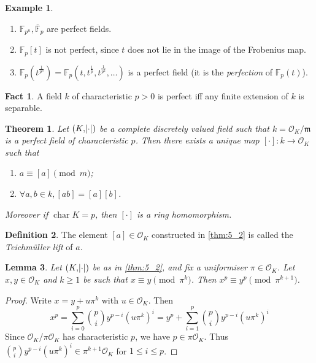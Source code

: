 \documentclass[11pt]{article}
\theoremstyle{definition}
\newtheorem{definition}{Definition}[subsection]
\newtheorem*{example}{Example}
\newtheorem*{fact}{Fact}
\theoremstyle{plain}
\newtheorem{theorem}[definition]{Theorem}
\newtheorem{lemma}[definition]{Lemma}
\theoremstyle{remark}
\DeclareMathOperator{\Char}{char}
\newcommand{\FF}{\mathbb{F}}
\newcommand{\cO}{\mathcal{O}}
\newcommand{\fm}{\mathfrak{m}}
\begin{document}
\begin{example}\phantom{}
    \begin{enumerate}
        \item $\FF_{p^n}, \overline{\FF}_p$ are perfect fields.
        \item $\FF_p[t]$ is not perfect, since $t$ does not lie in the image of the Frobenius map.
        \item $\FF_p(t^\frac{1}{p^n}) = \FF_p(t, t^\frac{1}{p}, t^\frac{1}{p^2}, \ldots)$ is a perfect field (it is the \emph{perfection} of $\FF_p(t)$).
    \end{enumerate}
\end{example}

\begin{fact}
    A field $k$ of characteristic $p > 0$ is perfect iff any finite extension of $k$ is separable.
\end{fact}

\begin{theorem}\label{thm:5_2}
    Let $(K, \abs{\cdot})$ be a complete discretely valued field such that $k = \cO_K / \fm$ is a perfect field of characteristic $p$. Then there exists a unique map $[\cdot] : k \to \cO_K$ such that
    \begin{enumerate}
        \item $a \equiv [a] \pmod{m}$;
        \item $\forall a, b \in k, [a b] = [a] [b]$.
    \end{enumerate}
    Moreover if $\Char K = p$, then $[\cdot]$ is a ring homomorphism.
\end{theorem}

\begin{definition}\label{def:5_3}
    The element $[a] \in \cO_K$ constructed in \autoref{thm:5_2} is called the \emph{Teichm\"uller lift} of $a$.
\end{definition}

\begin{lemma}\label{lem:5_4}
    Let $(K, \abs{\cdot})$ be as in \autoref{thm:5_2}, and fix a uniformiser $\pi \in \cO_K$. Let $x, y \in \cO_K$ and $k \ge 1$ be such that $x \equiv y \pmod{\pi^k}$. Then $x^p \equiv y^p \pmod{\pi^{k+1}}$.
\end{lemma}
\begin{proof}
    Write $x = y + u \pi^k$ with $u \in \cO_K$. Then
    \begin{equation*}
        x^p
        = \sum_{i=0}^p \binom{p}{i} y^{p-i} (u \pi^k)^i
        = y^p + \sum_{i=1}^p \binom{p}{i} y^{p-i} (u \pi^k)^i
    \end{equation*}
    Since $\cO_K / \pi \cO_K$ has characteristic $p$, we have $p \in \pi \cO_K$. Thus $\binom{p}{i} y^{p-i} (u \pi^k)^i \in \pi^{k+1} \cO_K$ for $1 \le i \le p$.
\end{proof}
\end{document}
